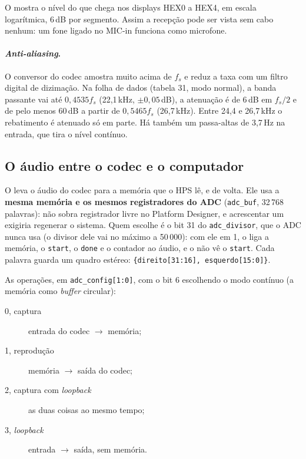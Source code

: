 O  mostra o nível do que chega nos displays HEX0 a HEX4, em
escala logarítmica, 6\,dB por segmento. Assim a recepção pode ser vista sem
cabo nenhum: um fone ligado no MIC-in funciona como microfone.

\paragraph{\emph{Anti-aliasing}.} O conversor do codec amostra muito acima de
\(f_s\) e reduz a taxa com um filtro digital de dizimação. Na folha de dados
(tabela 31, modo normal), a banda passante vai até \(0{,}4535 f_s\)
(22,1\,kHz, \(\pm 0{,}05\)\,dB), a atenuação é de 6\,dB em \(f_s/2\) e de pelo
menos 60\,dB a partir de \(0{,}5465 f_s\) (26,7\,kHz). Entre 24,4 e 26,7\,kHz o
rebatimento é atenuado só em parte. Há também um passa-altas de 3,7\,Hz na
entrada, que tira o nível contínuo.

\subsection{O áudio entre o codec e o computador}
\label{sec:codec-hps}

O  leva o áudio do codec para a memória que o HPS lê, e de
volta. Ele usa a \textbf{mesma memória e os mesmos registradores do ADC}
(\texttt{adc\_buf}, 32\,768 palavras): não sobra registrador livre no Platform
Designer, e acrescentar um exigiria regenerar o sistema. Quem escolhe é o bit
31 do \texttt{adc\_divisor}, que o ADC nunca usa (o divisor dele vai no máximo a
50\,000): com ele em 1, o  liga a memória, o \texttt{start}, o
\texttt{done} e o contador ao áudio, e o  não vê o
\texttt{start}. Cada palavra guarda um quadro estéreo:
\texttt{\{direito[31:16], esquerdo[15:0]\}}.

As operações, em \texttt{adc\_config[1:0]}, com o bit 6 escolhendo o modo
contínuo (a memória como \emph{buffer} circular):

\begin{description}
  \item[0, captura] entrada do codec \(\to\) memória;
  \item[1, reprodução] memória \(\to\) saída do codec;
  \item[2, captura com \emph{loopback}] as duas coisas ao mesmo tempo;
  \item[3, \emph{loopback}] entrada \(\to\) saída, sem memória.
\end{description}


